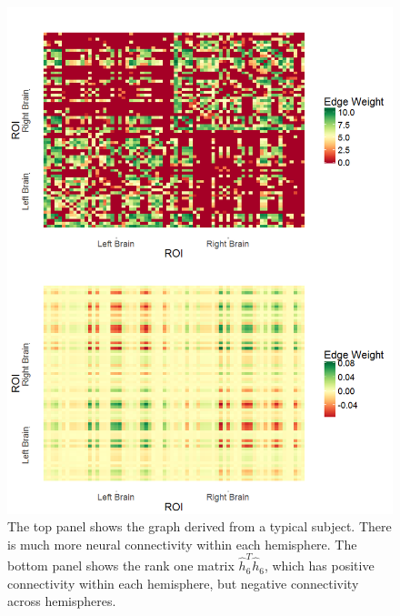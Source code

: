 \documentclass[simplex.tex]{subfiles}
\begin{document}
\begin{figure}[!h]
\begin{cframed}
\centering
\includegraphics[scale=0.25]{../../figs/cci_data.png}
\caption{The top panel shows the graph derived from a typical subject. There is much more neural connectivity within each hemisphere. The bottom panel shows the rank one matrix $\hat{h}_6^T\hat{h}_6$, which has positive  connectivity within each hemisphere, but negative  connectivity across hemispheres.}
\label{fig:cci1}
\end{cframed}
\end{figure}
%
\clearpage
\end{document}
